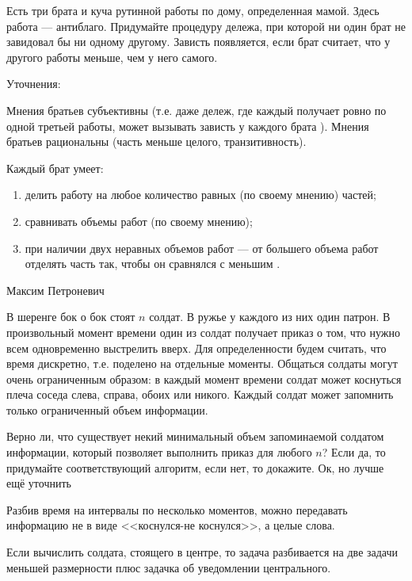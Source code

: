 \begin{problem}

Есть три брата и куча рутинной работы по дому, определенная мамой. Здесь работа --- антиблаго. Придумайте процедуру дележа, при которой ни один брат не завидовал бы ни одному другому. Зависть появляется, если брат считает, что у другого работы меньше, чем у него самого. \par
Уточнения: \par
Мнения братьев субъективны (т.е. даже дележ, где каждый получает ровно по одной третьей работы, может вызывать зависть у каждого брата ). Мнения братьев рациональны (часть меньше целого, транзитивность). \par
Каждый брат умеет: 
\begin{enumerate}
\item  делить работу на любое количество равных (по своему мнению) частей; 
\item сравнивать объемы работ (по своему мнению); 
\item  при наличии двух неравных объемов работ --- от большего объема работ отделять часть так, чтобы он сравнялся с меньшим \cite{peterson:epefcd}.
\end{enumerate}


\begin{sol}

\end{sol}
\end{problem}



\begin{problem}
\begin{source}
Максим Петроневич
\end{source}
В шеренге бок о бок стоят  $n$  солдат. В ружье у каждого из них один патрон. В произвольный момент времени один из солдат получает приказ о том, что нужно всем одновременно выстрелить вверх. Для определенности будем считать, что время дискретно, т.е. поделено на отдельные моменты. Общаться солдаты могут очень ограниченным образом: в каждый момент времени солдат может коснуться плеча соседа слева, справа, обоих или никого. Каждый солдат может запомнить только ограниченный объем информации.\par
Верно ли, что существует некий минимальный объем запоминаемой солдатом информации, который позволяет выполнить приказ для любого  $n$? Если да, то придумайте соответствующий алгоритм, если нет, то докажите.
{\red Ок, но лучше ещё уточнить}


\begin{sol}

Разбив время на интервалы по несколько моментов, можно передавать информацию не в виде <<коснулся-не коснулся>>, а целые слова.\par
Если вычислить солдата, стоящего в центре, то задача разбивается на две задачи меньшей размерности плюс задачка об уведомлении центрального.
\end{sol}
\end{problem}







